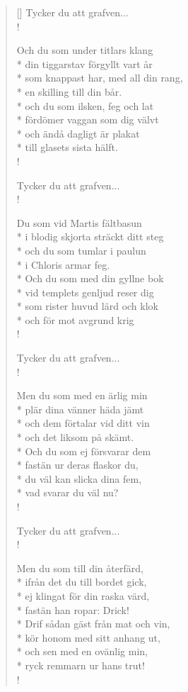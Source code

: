 \begin{verse}[\versewidth]
Tycker du att grafven...\\!

Och du som under titlars klang\\*
din tiggarstav förgyllt vart år\\*
som knappast har, med all din rang,\\*
en skilling till din bår.\\*
och du som ilsken, feg och lat\\*
fördömer vaggan som dig välvt\\*
och ändå dagligt är plakat\\*
till glasets sista hälft.\\!

Tycker du att grafven...\\!

Du som vid Martis fältbasun\\*
i blodig skjorta sträckt ditt steg\\*
och du som tumlar i paulun\\*
i Chloris armar feg.\\*
Och du som med din gyllne bok\\*
vid templets genljud reser dig\\*
som rister huvud lärd och klok\\*
och för mot avgrund krig\\!

Tycker du att grafven...\\!

Men du som med en ärlig min\\*
plär dina vänner häda jämt\\*
och dem förtalar vid ditt vin\\*
och det liksom på skämt.\\*
Och du som ej försvarar dem\\* 
fastän ur deras flaskor du,\\*
du väl kan slicka dina fem,\\*
vad svarar du väl nu?\\!

Tycker du att grafven...\\!


Men du som till din återfärd,\\*
ifrån det du till bordet gick,\\*
ej klingat för din raska värd,\\*
fastän han ropar: Drick!\\*
Drif sådan gäst från mat och vin,\\*
kör honom med sitt anhang ut,\\*
och sen med en ovänlig min,\\*
ryck remmarn ur hans trut!\\!


\end{verse}
